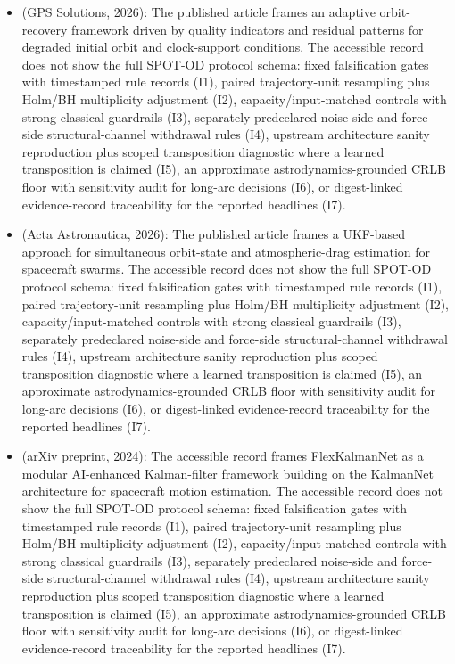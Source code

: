 \begin{itemize}[leftmargin=*]
  \item \cite{chen2026orbitrecovery} (GPS Solutions, 2026): The published article frames an adaptive orbit-recovery framework driven by quality indicators and residual patterns for degraded initial orbit and clock-support conditions. The accessible record does not show the full SPOT-OD protocol schema: fixed falsification gates with timestamped rule records (I1), paired trajectory-unit resampling plus Holm/BH multiplicity adjustment (I2), capacity/input-matched controls with strong classical guardrails (I3), separately predeclared noise-side and force-side structural-channel withdrawal rules (I4), upstream architecture sanity reproduction plus scoped transposition diagnostic where a learned transposition is claimed (I5), an approximate astrodynamics-grounded CRLB floor with sensitivity audit for long-arc decisions (I6), or digest-linked evidence-record traceability for the reported headlines (I7).
  \item \cite{lowe2026drag} (Acta Astronautica, 2026): The published article frames a UKF-based approach for simultaneous orbit-state and atmospheric-drag estimation for spacecraft swarms. The accessible record does not show the full SPOT-OD protocol schema: fixed falsification gates with timestamped rule records (I1), paired trajectory-unit resampling plus Holm/BH multiplicity adjustment (I2), capacity/input-matched controls with strong classical guardrails (I3), separately predeclared noise-side and force-side structural-channel withdrawal rules (I4), upstream architecture sanity reproduction plus scoped transposition diagnostic where a learned transposition is claimed (I5), an approximate astrodynamics-grounded CRLB floor with sensitivity audit for long-arc decisions (I6), or digest-linked evidence-record traceability for the reported headlines (I7).
  \item \cite{pinheiro2024flexkalmannet} (arXiv preprint, 2024): The accessible record frames FlexKalmanNet as a modular AI-enhanced Kalman-filter framework building on the KalmanNet architecture for spacecraft motion estimation. The accessible record does not show the full SPOT-OD protocol schema: fixed falsification gates with timestamped rule records (I1), paired trajectory-unit resampling plus Holm/BH multiplicity adjustment (I2), capacity/input-matched controls with strong classical guardrails (I3), separately predeclared noise-side and force-side structural-channel withdrawal rules (I4), upstream architecture sanity reproduction plus scoped transposition diagnostic where a learned transposition is claimed (I5), an approximate astrodynamics-grounded CRLB floor with sensitivity audit for long-arc decisions (I6), or digest-linked evidence-record traceability for the reported headlines (I7).

\end{itemize}
